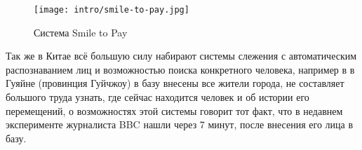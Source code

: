 \begin{figure}[H]
    \centering
    \texttt{[image: intro/smile-to-pay.jpg]}
    \caption{Система Smile to Pay} %
\end{figure}

Так же в Китае всё большую силу набирают системы слежения с автоматическим распознаванием лиц и возможностью поиска конкретного человека, например в в Гуяйне (провинция Гуйчжоу) в базу внесены все жители города, не составляет большого труда узнать, где сейчас находится человек и об истории его перемещений, о возможностях этой системы говорит тот факт, что в недавнем эксперименте журналиста BBC нашли через 7 минут, после внесения его лица в базу\cite{china-face-recognition}.






